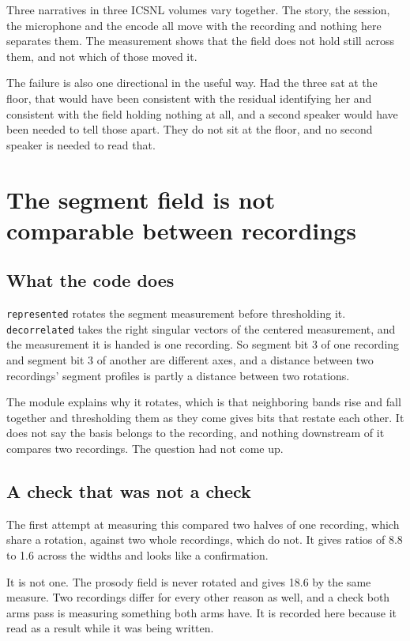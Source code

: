 Three narratives in three ICSNL volumes vary together. The story, the session, the microphone and
the encode all move with the recording and nothing here separates them. The measurement shows that the
field does not hold still across them, and not which of those moved it.

The failure is also one directional in the useful way. Had the three sat at the floor, that would
have been consistent with the residual identifying her and consistent with the field holding nothing
at all, and a second speaker would have been needed to tell those apart. They do not sit at the
floor, and no second speaker is needed to read that.

\section{The segment field is not comparable between recordings}

\subsection{What the code does}

\texttt{represented} rotates the segment measurement before thresholding it.
\texttt{decorrelated} takes the right singular vectors of the centered measurement, and the
measurement it is handed is one recording. So segment bit 3 of one recording and segment bit 3 of
another are different axes, and a distance between two recordings' segment profiles is partly a
distance between two rotations.

The module explains why it rotates, which is that neighboring bands rise and fall together and
thresholding them as they come gives bits that restate each other. It does not say the basis belongs
to the recording, and nothing downstream of it compares two recordings. The question had not come
up.

\subsection{A check that was not a check}

The first attempt at measuring this compared two halves of one recording, which share a rotation,
against two whole recordings, which do not. It gives ratios of 8.8 to 1.6 across the widths and
looks like a confirmation.

It is not one. The prosody field is never rotated and gives 18.6 by the same measure. Two recordings
differ for every other reason as well, and a check both arms pass is measuring something both arms
have. It is recorded here because it read as a result while it was being written.

